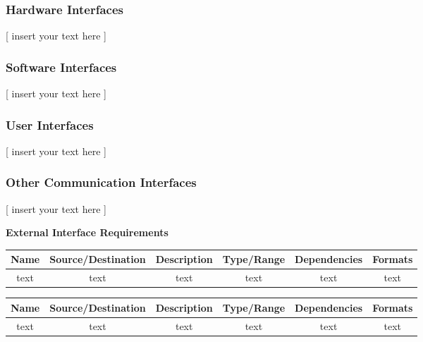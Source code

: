 \documentclass[twoside,letterpaper]{article}
\begin{document}
\subsubsection{Hardware Interfaces}
[ insert your
text here ]

\subsubsection{Software Interfaces}
[ insert your
text here ]

\subsubsection{User Interfaces}
[ insert your
text here ]

\subsubsection{Other Communication Interfaces}
[ insert your
text here ]


\bigskip


\bigskip

\bigskip
\clearpage

\begin{minipage}{\linewidth}
\centering
\textbf{External Interface Requirements}
\end{minipage}

\bigskip

\begin{minipage}{\linewidth}
\centering
{}
\begin{tabular}{c c c c c c } \toprule[1.5pt]
\bf Name & \bf Source/Destination & \bf Description & \bf Type/Range & \bf Dependencies & \bf Formats\\ \midrule[1.0pt]
 text & text & text & text & text & text \\
\bottomrule[1.5pt]
\end {tabular} %
\end{minipage}

\bigskip

\begin{minipage}{\linewidth}
\centering
{}
\begin{tabular}{c c c c c c } \toprule[1.5pt]
\bf Name & \bf Source/Destination & \bf Description & \bf Type/Range & \bf Dependencies & \bf Formats\\ \toprule[1.0pt]
 text & text & text & text & text & text \\
\bottomrule[1.5pt]
\end {tabular} %
\end{minipage}
\end{document}

